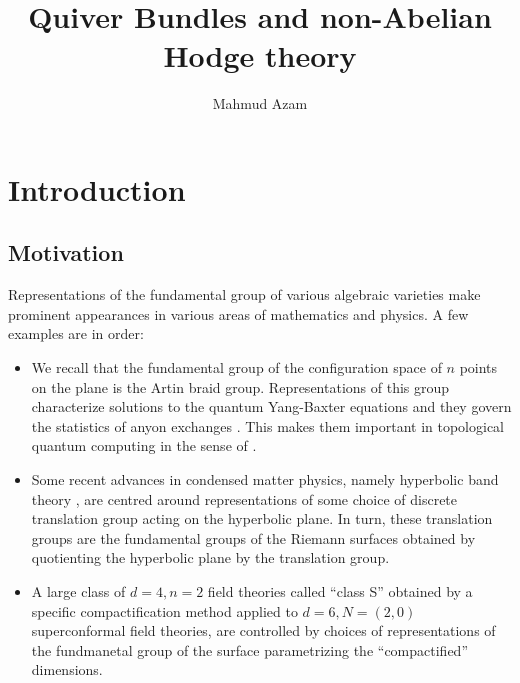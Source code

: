 \documentclass[11pt]{amsart}
\title[Quiver Bundles and non-Abelian Hodge theory]
      {Quiver Bundles and non-Abelian Hodge theory}
\author{Mahmud Azam}
\begin{document}
\maketitle

\tableofcontents


\section{Introduction}

\subsection{Motivation}

Representations of the fundamental group of various algebraic varieties make
prominent appearances in various areas of mathematics and physics. A few
examples are in order:

\begin{itemize}
\item We recall that the fundamental group of the configuration space of $n$
points on the plane is the Artin braid group. Representations of this
group characterize solutions to the quantum Yang-Baxter equations
\cite{BirmanKnotThry} and they govern the statistics of anyon exchanges
\cite{GoldinAnyons}. This makes them important in topological quantum computing
\cite{KauffmanBraidRepQGates} in the sense of \cite{TopPhasesQC}.

\item Some recent advances in condensed matter physics, namely hyperbolic band
theory \cites{HyperbolicBandTheory, HypBloch}, are centred around
representations of some choice of discrete translation group acting on the
hyperbolic plane. In turn, these translation groups are the fundamental groups
of the Riemann surfaces obtained by quotienting the hyperbolic plane by the
translation group.

\item A large class of $d = 4, n = 2$ field theories called ``class S''
\cite{ClassS} obtained by a specific compactification method applied to
$d = 6, N = (2, 0)$ superconformal field theories, are controlled by
choices of representations of the fundmanetal group of the surface
parametrizing the ``compactified'' dimensions.
\end{itemize}
\end{document}
